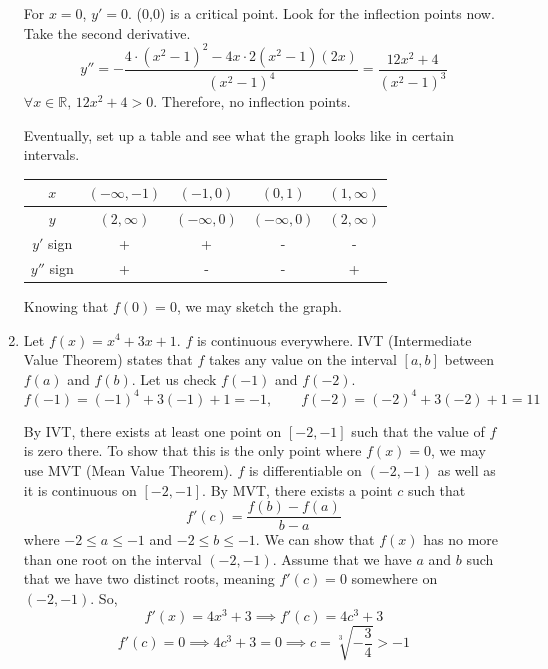 \documentclass[a4paper, 12pt]{article}
\begin{document}
\begin{enumerate}[leftmargin=*,label=\textbf{\arabic*.}]
For $x=0$, $y'=0$. (0,0) is a critical point. Look for the inflection points now. Take the second derivative.
\[y''=-\frac{4\cdot\left(x^2-1\right)^2-4x\cdot2\left(x^2-1\right)(2x)}{\left(x^2-1\right)^4}=\frac{12x^2+4}{\left(x^2-1\right)^3}\]
$\forall x \in \mathbb{R},\,12x^2+4 > 0$. Therefore, no inflection points.

Eventually, set up a table and see what the graph looks like in certain intervals.
\begin{center}
    \large
    \begin{tabular}{ |c| c c c c| } 
    \hline
        $x$ & $(-\infty, -1)$ & $(-1, 0)$ & $(0, 1)$ &  $(1, \infty)$ \\
        \hline
        $y$ & $(2, \infty)$ & $(-\infty, 0)$ & $(-\infty, 0)$ & $(2, \infty)$\\
        \hline
        $y'$ sign & + & + & - & - \\
        \hline
        $y''$ sign & + & - & - & + \\
        \hline
    \end{tabular}
\end{center}

Knowing that $f(0)=0$, we may sketch the graph.
\begin{center}
\end{center}

\newpage

\item Let $f(x) = x^4 +3x+1$. $f$ is continuous everywhere. IVT (Intermediate Value Theorem) states that $f$ takes any value on the interval $[a, b]$ between $f(a)$ and $f(b)$. Let us check $f(-1)$ and $f(-2)$.
\[ f(-1) = (-1)^4 + 3(-1) + 1 = -1,\qquad f(-2) = (-2)^4 + 3(-2) + 1 = 11\]

By IVT, there exists at least one point on $[-2, -1]$ such that the value of $f$ is zero there. To show that this is the only point where $f(x) = 0$, we may use MVT (Mean Value Theorem). $f$ is differentiable on $(-2, -1)$ as well as it is continuous on $[-2, -1]$. By MVT, there exists a point $c$ such that
\[f'(c)=\frac{f(b)-f(a)}{b-a}\]
where $-2\leq a \leq-1$ and $-2\leq b\leq-1$. We can show that $f(x)$ has no more than one root on the interval $(-2, -1)$. Assume that we have $a$ and $b$ such that we have two distinct roots, meaning $f'(c) = 0$ somewhere on $(-2, -1)$. So,
\[f'(x)=4x^3+3\implies f'(c)=4c^3+3\]
\[f'(c)=0\implies4c^3+3=0\implies c=\sqrt[3]{-\frac{3}{4}}>-1\]


\end{enumerate}
\end{document}

